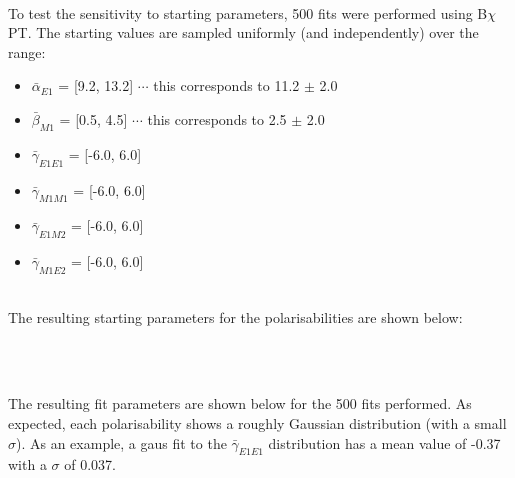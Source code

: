 \documentclass[]{article}
\begin{document}
\noindent\\ To test the sensitivity to starting parameters, 500 fits were performed using B$\chi$PT. The starting values are sampled uniformly (and independently) over the range:
\begin{itemize}
	\item $\bar{\alpha}_{E1}$ \hspace{4.5mm}= [9.2, 13.2] \hspace{3.75mm} $\cdots$ this corresponds to 11.2 $\pm$ 2.0
	\item $\bar{\beta}_{M1}$ \hspace{4mm}= [0.5, 4.5] \hspace{5mm} $\cdots$ this corresponds to 2.5 $\pm$ 2.0
	\item $\bar{\gamma}_{E1E1}$ \hspace{1.5mm}= [-6.0, 6.0]
	\item $\bar{\gamma}_{M1M1}$ = [-6.0, 6.0]
	\item $\bar{\gamma}_{E1M2}$ \hspace{1mm}= [-6.0, 6.0]
	\item $\bar{\gamma}_{M1E2}$ \hspace{1mm}= [-6.0, 6.0]
\end{itemize}

\noindent\\ The resulting starting parameters for the polarisabilities are shown below:

\begin{figure}[h!]
	\centering
\end{figure}

\newpage
\begin{figure}[h!]
	\centering
	 \\	
	 \\		
\end{figure}


\clearpage
\noindent The resulting fit parameters are shown below for the 500 fits performed. As expected, each polarisability shows a roughly Gaussian distribution (with a small $\sigma$). As an example, a gaus fit to the $\bar{\gamma}_{E1E1}$ distribution has a mean value of -0.37 with a $\sigma$ of 0.037. 
\end{document}
